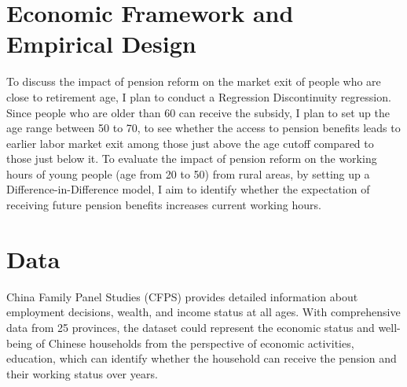 \section{Economic Framework and Empirical Design}
To discuss the impact of pension reform on the market exit of people who are close to retirement age, I plan to conduct a Regression Discontinuity regression. Since people who are older than 60 can receive the subsidy, I plan to set up the age range between 50 to 70, to see whether the access to pension benefits leads to earlier labor market exit among those just above the age cutoff compared to those just below it. To evaluate the impact of pension reform on the working hours of young people (age from 20 to 50) from rural areas, by setting up a Difference-in-Difference model, I aim to identify whether the expectation of receiving future pension benefits increases current working hours.

\section{Data}
China Family Panel Studies (CFPS) provides detailed information about employment decisions, wealth, and income status at all ages. With comprehensive data from 25 provinces, the dataset could represent the economic status and well-being of Chinese households from the perspective of economic activities, education, which can identify whether the household can receive the pension and their working status over years.





